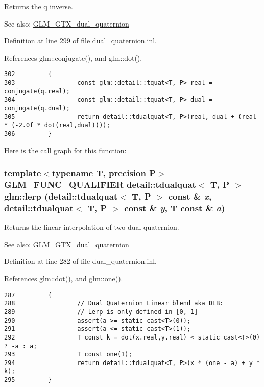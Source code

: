 Returns the q inverse.

\begin{Desc}
\item[See also:]\hyperlink{group__gtc__dual__quaternion}{GLM\_\-GTX\_\-dual\_\-quaternion} \end{Desc}


Definition at line 299 of file dual\_\-quaternion.inl.

References glm::conjugate(), and glm::dot().

\begin{Code}\begin{verbatim}302         {
303                 const glm::detail::tquat<T, P> real = conjugate(q.real);
304                 const glm::detail::tquat<T, P> dual = conjugate(q.dual);
305                 return detail::tdualquat<T, P>(real, dual + (real * (-2.0f * dot(real,dual))));
306         }
\end{verbatim}
\end{Code}




Here is the call graph for this function:\hypertarget{group__gtc__dual__quaternion_gfbbdf3bd28dbfe656af3d86b9c7e0cd3}{
\subsubsection[lerp]{\setlength{\rightskip}{0pt plus 5cm}template$<$typename T, precision P$>$ GLM\_\-FUNC\_\-QUALIFIER detail::tdualquat$<$ T, P $>$ glm::lerp (detail::tdualquat$<$ T, P $>$ const \& {\em x}, \/  detail::tdualquat$<$ T, P $>$ const \& {\em y}, \/  T const \& {\em a})}}
\label{group__gtc__dual__quaternion_gfbbdf3bd28dbfe656af3d86b9c7e0cd3}


Returns the linear interpolation of two dual quaternion.

\begin{Desc}
\item[See also:]\hyperlink{group__gtc__dual__quaternion}{GLM\_\-GTX\_\-dual\_\-quaternion} \end{Desc}


Definition at line 282 of file dual\_\-quaternion.inl.

References glm::dot(), and glm::one().

\begin{Code}\begin{verbatim}287         {
288                 // Dual Quaternion Linear blend aka DLB:
289                 // Lerp is only defined in [0, 1]
290                 assert(a >= static_cast<T>(0));
291                 assert(a <= static_cast<T>(1));
292                 T const k = dot(x.real,y.real) < static_cast<T>(0) ? -a : a;
293                 T const one(1);
294                 return detail::tdualquat<T, P>(x * (one - a) + y * k);
295         }
\end{verbatim}
\end{Code}





